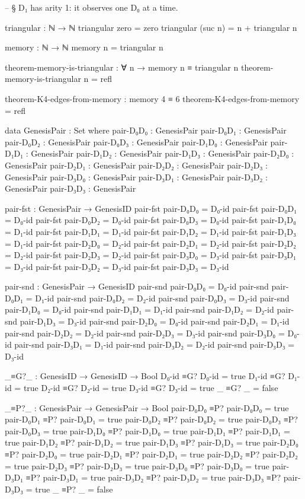 \documentclass[11pt,a4paper]{book}
\begin{document}
\begin{code}
-- § D₁ has arity 1: it observes one D₀ at a time.

triangular : ℕ → ℕ
triangular zero = zero
triangular (suc n) = n + triangular n

memory : ℕ → ℕ
memory n = triangular n

theorem-memory-is-triangular : ∀ n → memory n ≡ triangular n
theorem-memory-is-triangular n = refl

theorem-K4-edges-from-memory : memory 4 ≡ 6
theorem-K4-edges-from-memory = refl

data GenesisPair : Set where
  pair-D₀D₀ : GenesisPair
  pair-D₀D₁ : GenesisPair
  pair-D₀D₂ : GenesisPair
  pair-D₀D₃ : GenesisPair
  pair-D₁D₀ : GenesisPair
  pair-D₁D₁ : GenesisPair
  pair-D₁D₂ : GenesisPair
  pair-D₁D₃ : GenesisPair
  pair-D₂D₀ : GenesisPair
  pair-D₂D₁ : GenesisPair
  pair-D₂D₂ : GenesisPair
  pair-D₂D₃ : GenesisPair
  pair-D₃D₀ : GenesisPair
  pair-D₃D₁ : GenesisPair
  pair-D₃D₂ : GenesisPair
  pair-D₃D₃ : GenesisPair

pair-fst : GenesisPair → GenesisID
pair-fst pair-D₀D₀ = D₀-id
pair-fst pair-D₀D₁ = D₀-id
pair-fst pair-D₀D₂ = D₀-id
pair-fst pair-D₀D₃ = D₀-id
pair-fst pair-D₁D₀ = D₁-id
pair-fst pair-D₁D₁ = D₁-id
pair-fst pair-D₁D₂ = D₁-id
pair-fst pair-D₁D₃ = D₁-id
pair-fst pair-D₂D₀ = D₂-id
pair-fst pair-D₂D₁ = D₂-id
pair-fst pair-D₂D₂ = D₂-id
pair-fst pair-D₂D₃ = D₂-id
pair-fst pair-D₃D₀ = D₃-id
pair-fst pair-D₃D₁ = D₃-id
pair-fst pair-D₃D₂ = D₃-id
pair-fst pair-D₃D₃ = D₃-id

pair-snd : GenesisPair → GenesisID
pair-snd pair-D₀D₀ = D₀-id
pair-snd pair-D₀D₁ = D₁-id
pair-snd pair-D₀D₂ = D₂-id
pair-snd pair-D₀D₃ = D₃-id
pair-snd pair-D₁D₀ = D₀-id
pair-snd pair-D₁D₁ = D₁-id
pair-snd pair-D₁D₂ = D₂-id
pair-snd pair-D₁D₃ = D₃-id
pair-snd pair-D₂D₀ = D₀-id
pair-snd pair-D₂D₁ = D₁-id
pair-snd pair-D₂D₂ = D₂-id
pair-snd pair-D₂D₃ = D₃-id
pair-snd pair-D₃D₀ = D₀-id
pair-snd pair-D₃D₁ = D₁-id
pair-snd pair-D₃D₂ = D₂-id
pair-snd pair-D₃D₃ = D₃-id

_≡G?_ : GenesisID → GenesisID → Bool
D₀-id ≡G? D₀-id = true
D₁-id ≡G? D₁-id = true
D₂-id ≡G? D₂-id = true
D₃-id ≡G? D₃-id = true
_     ≡G? _     = false

_≡P?_ : GenesisPair → GenesisPair → Bool
pair-D₀D₀ ≡P? pair-D₀D₀ = true
pair-D₀D₁ ≡P? pair-D₀D₁ = true
pair-D₀D₂ ≡P? pair-D₀D₂ = true
pair-D₀D₃ ≡P? pair-D₀D₃ = true
pair-D₁D₀ ≡P? pair-D₁D₀ = true
pair-D₁D₁ ≡P? pair-D₁D₁ = true
pair-D₁D₂ ≡P? pair-D₁D₂ = true
pair-D₁D₃ ≡P? pair-D₁D₃ = true
pair-D₂D₀ ≡P? pair-D₂D₀ = true
pair-D₂D₁ ≡P? pair-D₂D₁ = true
pair-D₂D₂ ≡P? pair-D₂D₂ = true
pair-D₂D₃ ≡P? pair-D₂D₃ = true
pair-D₃D₀ ≡P? pair-D₃D₀ = true
pair-D₃D₁ ≡P? pair-D₃D₁ = true
pair-D₃D₂ ≡P? pair-D₃D₂ = true
pair-D₃D₃ ≡P? pair-D₃D₃ = true
_         ≡P? _         = false


\end{code}
\end{document}
